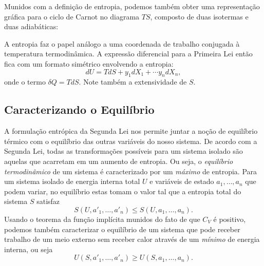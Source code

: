 \documentclass[a4paper, 12pt]{article}
\theoremstyle{definition}
\theoremstyle{definition}
\begin{document}
Munidos com a definição de entropia, podemos também obter uma representação gráfica para o ciclo de
Carnot no diagrama $TS$, composto de duas isotermas e duas adiabáticas:

\begin{figure}[H]
    \centering
\end{figure}

A entropia faz o papel análogo a uma coordenada de trabalho conjugada à temperatura termodinâmica. A
expressão diferencial para a Primeira Lei então fica com um formato simétrico envolvendo a entropia:
$$dU=TdS+y_1dX_1+\cdots y_ndX_n,$$
onde o termo $\delta Q=TdS$. Note também a extensividade de $S$.

\subsection{Caracterizando o Equilíbrio}

A formulação entrópica da Segunda Lei nos permite juntar a noção de equilíbrio térmico com o equilíbrio
das outras variáveis do nosso sistema. De acordo com a Segunda Lei, todas as transformações possíveis para
um sistema isolado são aquelas que acarretam em um aumento de entropia. Ou seja, o \textit{equilíbrio
termodinâmico} de um sistema é caracterizado por um \textit{máximo} de entropia. Para um sistema isolado
de energia interna total $U$ e variáveis de estado $a_1,\dots,a_n$ que podem variar, no equilíbrio estas
tomam o valor tal que a entropia total do sistema $S$ satisfaz
$$S(U,a'_1,\dots,a'_n)\leq S(U,a_1,\dots,a_n).$$
Usando o teorema da função implícita munidos do fato de que $C_V$ é positivo, podemos também caracterizar
o equilíbrio de um sistema que pode receber trabalho de um meio externo sem receber calor através de um
\textit{mínimo} de energia interna, ou seja
$$U(S,a'_1,\dots,a'_n)\geq U(S,a_1,\dots,a_n).$$
\end{document}
